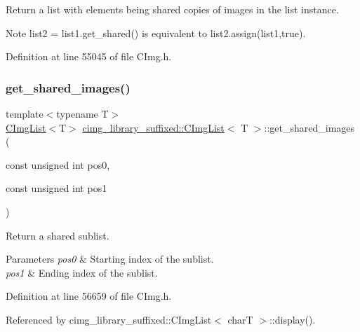 Return a list with elements being shared copies of images in the list instance. 

\begin{DoxyNote}{Note}
{\ttfamily list2 = list1.\+get\+\_\+shared()} is equivalent to {\ttfamily list2.\+assign(list1,true)}. 
\end{DoxyNote}


Definition at line 55045 of file C\+Img.\+h.

\mbox{\label{structcimg__library__suffixed_1_1CImgList_a1a54d7eef89663fdcc5ffb61ed9a48b5}} 
\subsubsection{\texorpdfstring{get\+\_\+shared\+\_\+images()}{get\_shared\_images()}}
{\footnotesize\ttfamily template$<$typename T$>$ \\
\hyperlink{structcimg__library__suffixed_1_1CImgList}{C\+Img\+List}$<$T$>$ \hyperlink{structcimg__library__suffixed_1_1CImgList}{cimg\+\_\+library\+\_\+suffixed\+::\+C\+Img\+List}$<$ T $>$\+::get\+\_\+shared\+\_\+images (\begin{DoxyParamCaption}\item[{const unsigned int}]{pos0,  }\item[{const unsigned int}]{pos1 }\end{DoxyParamCaption})\hspace{0.3cm}{\ttfamily [inline]}}



Return a shared sublist. 


\begin{DoxyParams}{Parameters}
{\em pos0} & Starting index of the sublist. \\
\hline
{\em pos1} & Ending index of the sublist. \\
\hline
\end{DoxyParams}


Definition at line 56659 of file C\+Img.\+h.



Referenced by cimg\+\_\+library\+\_\+suffixed\+::\+C\+Img\+List$<$ char\+T $>$\+::display().

